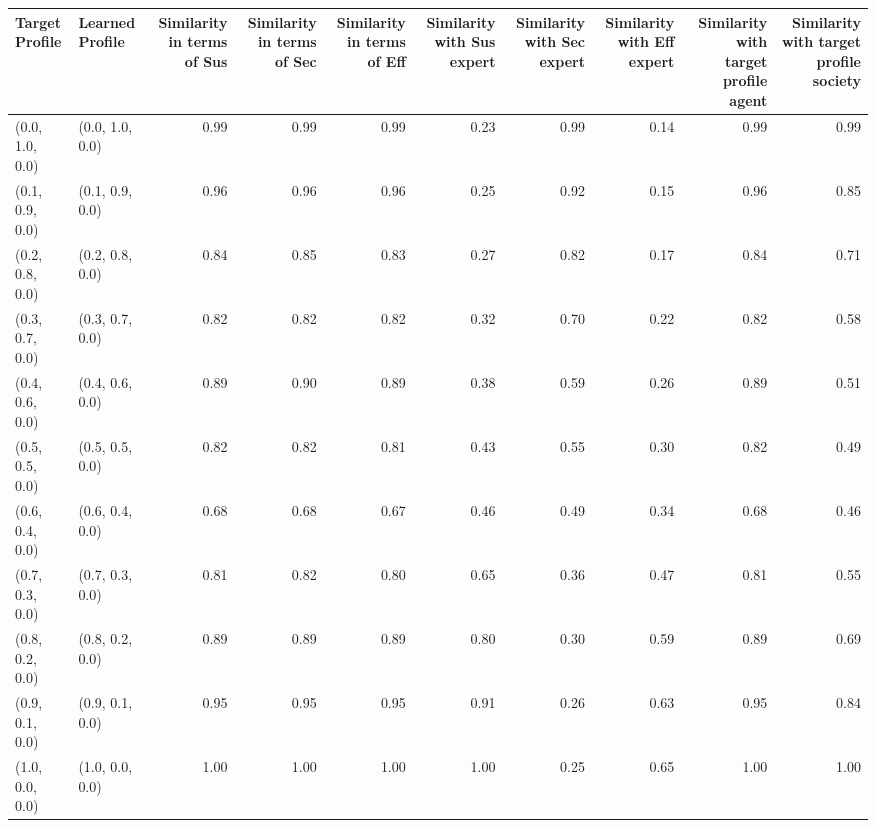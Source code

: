 \begin{tabular}{llrrrrrrrr}
\toprule
Target Profile & Learned Profile & Similarity in terms of Sus & Similarity in terms of Sec & Similarity in terms of Eff & Similarity with Sus expert & Similarity with Sec expert & Similarity with Eff expert & Similarity with target profile agent & Similarity with target profile society \\
\midrule
(0.0, 1.0, 0.0) & (0.0, 1.0, 0.0) & 0.99 & 0.99 & 0.99 & 0.23 & 0.99 & 0.14 & 0.99 & 0.99 \\
(0.1, 0.9, 0.0) & (0.1, 0.9, 0.0) & 0.96 & 0.96 & 0.96 & 0.25 & 0.92 & 0.15 & 0.96 & 0.85 \\
(0.2, 0.8, 0.0) & (0.2, 0.8, 0.0) & 0.84 & 0.85 & 0.83 & 0.27 & 0.82 & 0.17 & 0.84 & 0.71 \\
(0.3, 0.7, 0.0) & (0.3, 0.7, 0.0) & 0.82 & 0.82 & 0.82 & 0.32 & 0.70 & 0.22 & 0.82 & 0.58 \\
(0.4, 0.6, 0.0) & (0.4, 0.6, 0.0) & 0.89 & 0.90 & 0.89 & 0.38 & 0.59 & 0.26 & 0.89 & 0.51 \\
(0.5, 0.5, 0.0) & (0.5, 0.5, 0.0) & 0.82 & 0.82 & 0.81 & 0.43 & 0.55 & 0.30 & 0.82 & 0.49 \\
(0.6, 0.4, 0.0) & (0.6, 0.4, 0.0) & 0.68 & 0.68 & 0.67 & 0.46 & 0.49 & 0.34 & 0.68 & 0.46 \\
(0.7, 0.3, 0.0) & (0.7, 0.3, 0.0) & 0.81 & 0.82 & 0.80 & 0.65 & 0.36 & 0.47 & 0.81 & 0.55 \\
(0.8, 0.2, 0.0) & (0.8, 0.2, 0.0) & 0.89 & 0.89 & 0.89 & 0.80 & 0.30 & 0.59 & 0.89 & 0.69 \\
(0.9, 0.1, 0.0) & (0.9, 0.1, 0.0) & 0.95 & 0.95 & 0.95 & 0.91 & 0.26 & 0.63 & 0.95 & 0.84 \\
(1.0, 0.0, 0.0) & (1.0, 0.0, 0.0) & 1.00 & 1.00 & 1.00 & 1.00 & 0.25 & 0.65 & 1.00 & 1.00 \\
\bottomrule
\end{tabular}
